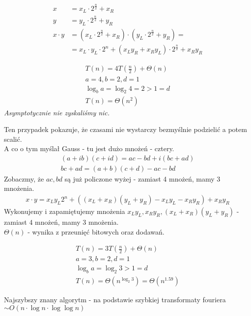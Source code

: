 \documentclass{article}
\begin{document}
\begin{align}
    x &= x_L \cdot 2^{\frac{n}{2}} + x_R\\
    y &= y_L \cdot 2^{\frac{n}{2}} + y_R\\
    x \cdot y &= \left(x_L \cdot 2^{\frac{n}{2}} + x_R\right) \cdot \left(y_L \cdot 2^{\frac{n}{2}} + y_R\right) =\\
    &= x_L \cdot y_L \cdot 2^n + \left(x_L y_R + x_R y_L\right) \cdot 2^{\frac{n}{2}} + x_R y_R
\end{align}

\begin{align}
    T(n) = 4T\left(\frac{n}{2}\right) + \Theta(n)\\
    a = 4, b = 2, d = 1\\
    \log_b a = \log_2 4 = 2 > 1 = d\\
    T(n) = \Theta(n^2)
\end{align}
\textit{Asymptotycznie nie zyskaliśmy nic.}

\noindent
Ten przypadek pokazuje, że czasami nie wystarczy bezmyślnie podzielić a potem scalić.\\

\noindent
A co o tym myślał Gauss - tu jest dużo mnożeń - cztery.
\begin{align}
    (a+ib)(c+id) = ac - bd + i(bc + ad)\\
    bc + ad = (a + b)(c + d) - ac - bd
\end{align}
Zobaczmy, że $ac, bd$ są już policzone wyżej - zamiast 4 mnożeń, mamy 3 mnożenia.
\begin{align}
    x\cdot y = x_L y_L 2^n + \left((x_L + x_R)(y_L + y_R) - x_Ly_L - x_Ry_R\right) + x_Ry_R
\end{align}
Wykonujemy i zapamiętujemy mnożenia $x_Ly_L, x_Ry_R, (x_L + x_R)(y_L + y_R)$ - zamiast 4 mnożeń, mamy 3 mnożenia.\\

\noindent
$\Theta(n)$ - wynika z przeunięć bitowych oraz dodawań.

\begin{align}
    T(n) = 3T\left(\frac{n}{2}\right) + \Theta(n)\\
    a = 3, b = 2, d = 1\\
    \log_b a = \log_2 3 > 1 = d\\
    T(n) = \Theta(n^{\log_2 3}) = \Theta(n^{1.59})
\end{align}

\noindent
Najszybszy znany algorytm - na podstawie szybkiej transformaty fouriera $\sim O(n\cdot \log n\cdot \log \log n)$
\end{document}
